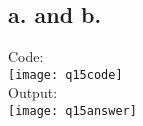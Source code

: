 \section{}

\subsection*{a. and b.}
Code:
\\
\texttt{[image: q15code]}
\\
Output:
\\
\texttt{[image: q15answer]}
